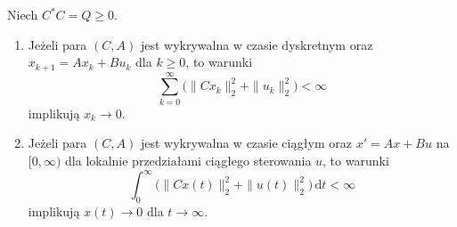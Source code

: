 \begin{lemat}
\label{lem:lin26-detectability-decay}
Niech \(C^*C=Q\ge0\).
\begin{enumerate}[label=\textup{(\roman*)}]
 \item Jeżeli para \((C,A)\)
 jest wykrywalna w czasie
 dyskretnym oraz
 \(x_{k+1}=Ax_k+Bu_k\)
 dla \(k\ge0\), to warunki
 \[
 \sum_{k=0}^{\infty}
   \bigl(\|Cx_k\|_2^2+\|u_k\|_2^2\bigr)
 <\infty
 \]
 implikują \(x_k\to0\).
 \item Jeżeli para \((C,A)\)
 jest wykrywalna w czasie
 ciągłym oraz
 \(x'=Ax+Bu\) na \([0,\infty)\)
 dla lokalnie przedziałami
 ciągłego sterowania \(u\),
 to warunki
 \[
 \int_0^\infty
   \bigl(\|Cx(t)\|_2^2+\|u(t)\|_2^2\bigr)
   \,\mathrm dt<\infty
 \]
 implikują \(x(t)\to0\)
 dla \(t\to\infty\).
\end{enumerate}
\end{lemat}
